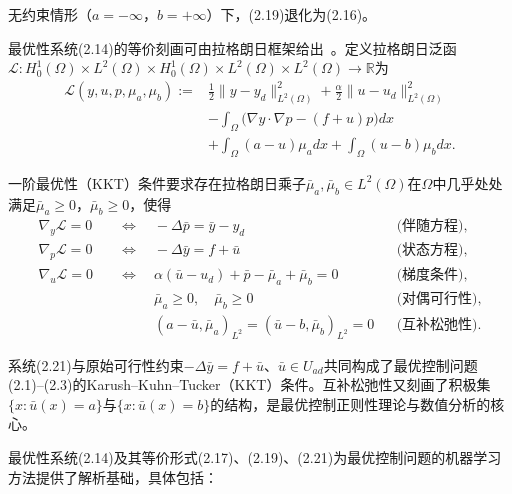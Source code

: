 \documentclass{xmu}
\theoremstyle{plain}
\theoremstyle{remark}
\begin{document}
无约束情形（$a = -\infty$，$b = +\infty$）下，(2.19)退化为(2.16)。

最优性系统(2.14)的等价刻画可由拉格朗日框架给出~\cite{1}。定义拉格朗日泛函$\mathcal{L} : H^1_0(\Omega) \times L^2(\Omega) \times H^1_0(\Omega) \times L^2(\Omega) \times L^2(\Omega) \to \mathbb{R}$为
\begin{equation}
\begin{aligned}
\mathcal{L}(y, u, p, \mu_a, \mu_b) :=&
\frac{1}{2}\|y - y_d\|^2_{L^2(\Omega)} + \frac{\alpha}{2}\|u - u_d\|^2_{L^2(\Omega)} \\
&- \int_\Omega \bigl(\nabla y \cdot \nabla p - (f + u)p \bigr) dx \\
&+ \int_\Omega (a - u)\mu_a dx + \int_\Omega (u - b)\mu_b dx.
\end{aligned}
\end{equation}

一阶最优性（KKT）条件要求存在拉格朗日乘子$\bar{\mu}_a, \bar{\mu}_b \in L^2(\Omega)$在$\Omega$中几乎处处满足$\bar{\mu}_a \ge 0$，$\bar{\mu}_b \ge 0$，使得
\begin{equation}
\begin{aligned}
\nabla_y \mathcal{L} = 0 \quad &\Longleftrightarrow \quad -\Delta \bar{p} = \bar{y} - y_d &&\text{(伴随方程)}, \\[3pt]
\nabla_p \mathcal{L} = 0 \quad &\Longleftrightarrow \quad -\Delta \bar{y} = f + \bar{u} &&\text{(状态方程)}, \\[3pt]
\nabla_u \mathcal{L} = 0 \quad &\Longleftrightarrow \quad \alpha(\bar{u} - u_d) + \bar{p} - \bar{\mu}_a + \bar{\mu}_b = 0 &&\text{(梯度条件)}, \\[3pt]
&\phantom{\Longleftrightarrow}\quad \bar{\mu}_a \ge 0, \quad \bar{\mu}_b \ge 0 &&\text{(对偶可行性)}, \\[3pt]
&\phantom{\Longleftrightarrow}\quad (a - \bar{u}, \bar{\mu}_a)_{L^2} = (\bar{u} - b, \bar{\mu}_b)_{L^2} = 0 &&\text{(互补松弛性)}.
\end{aligned}
\end{equation}

系统(2.21)与原始可行性约束$-\Delta\bar{y} = f + \bar{u}$、$\bar{u} \in U_{ad}$共同构成了最优控制问题(2.1)–(2.3)的Karush–Kuhn–Tucker（KKT）条件。互补松弛性又刻画了积极集$\{x : \bar{u}(x) = a\}$与$\{x : \bar{u}(x) = b\}$的结构，是最优控制正则性理论与数值分析的核心。

最优性系统(2.14)及其等价形式(2.17)、(2.19)、(2.21)为最优控制问题的机器学习方法提供了解析基础，具体包括：
\end{document}
